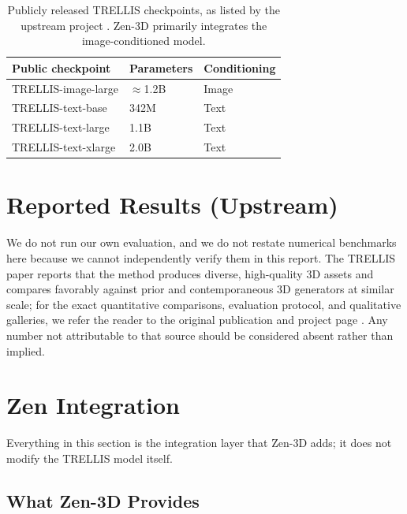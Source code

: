 \documentclass[11pt,a4paper]{article}
\begin{document}
\begin{table}[H]
\centering
\begin{tabular}{lll}
\toprule
\textbf{Public checkpoint} & \textbf{Parameters} & \textbf{Conditioning} \\
\midrule
TRELLIS-image-large & $\approx$1.2B & Image \\
TRELLIS-text-base & 342M & Text \\
TRELLIS-text-large & 1.1B & Text \\
TRELLIS-text-xlarge & 2.0B & Text \\
\bottomrule
\end{tabular}
\caption{Publicly released TRELLIS checkpoints, as listed by the upstream project
\cite{trellis_repo}. Zen-3D primarily integrates the image-conditioned model.}
\end{table}

\section{Reported Results (Upstream)}

We do not run our own evaluation, and we do not restate numerical benchmarks here because we
cannot independently verify them in this report. The TRELLIS paper reports that the method
produces diverse, high-quality 3D assets and compares favorably against prior and contemporaneous
3D generators at similar scale; for the exact quantitative comparisons, evaluation protocol, and
qualitative galleries, we refer the reader to the original publication and project page
\cite{xiang2024trellis,trellis_repo}. Any number not attributable to that source should be
considered absent rather than implied.

\section{Zen Integration}

Everything in this section is the integration layer that Zen-3D adds; it does not modify the
TRELLIS model itself.

\subsection{What Zen-3D Provides}
\end{document}
